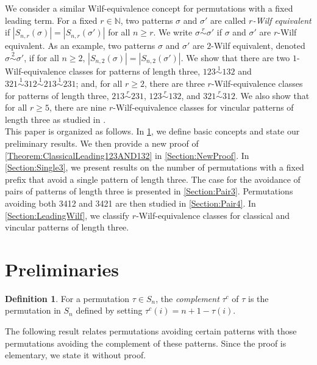 \documentclass[11pt]{article}
\theoremstyle{definition}
\newtheorem{definition}[theorem]{Definition}
\newcommand{\rsim}{\stackrel{r}{\sim}}
\numberwithin{equation}{section}
\begin{document}
We consider a similar Wilf-equivalence concept for permutations with a fixed leading term. 
For a 
fixed $r\in\mathbb{N}$, two patterns $\sigma$ and $\sigma'$ are 
called {\em $r$-Wilf equivalent} if $|S_{n,r}(\sigma)|=|S_{n,r}(\sigma')|$ for all 
$n\geq r$. We 
write $\sigma\rsim\sigma'$ if $\sigma$ and $\sigma'$ are $r$-Wilf equivalent. As an example, two patterns $\sigma$ and $\sigma'$ are $2$-Wilf 
equivalent, denoted $\sigma\stackrel{2}{\sim}\sigma'$, if for all $n\geq2$, $|S_{n,2}(\sigma)|=|S_{n,2}(\sigma')|$. We show that there are two $1$-Wilf-equivalence classes 
for patterns of length three, 
$123\stackrel{1}{\sim} 132$ and $321\stackrel{1}{\sim}312\stackrel{1}{\sim}213\stackrel{1}{\sim}231$; and, for all $r\geq2$, there are three $r$-Wilf-equivalence classes for patterns of length three, $213\rsim231$, $123\rsim132$, and $321\rsim312$. We also show that for all $r\geq5$, there are nine $r$-Wilf-equivalence classes for vincular patterns of length three as studied in \cite{BabsonSteingrimsson2000,Claesson2001}.
\\



This paper is organized as follows. In \cref{Section:Preliminaries}, we define basic 
concepts and state our preliminary results. We then provide a new proof of \cref{Theorem:ClassicalLeading123AND132} in \cref{Section:NewProof}. In \cref{Section:Single3}, we present results on the number of permutations 
with a fixed prefix that avoid a single pattern of length three. 
The case for the avoidance of pairs of patterns of length three 
is presented in \cref{Section:Pair3}. Permutations avoiding both 3412 and 3421 are then studied in \cref{Section:Pair4}. In \cref{Section:LeadingWilf}, we classify $r$-Wilf-equivalence classes for classical and vincular patterns of length three.



\section{Preliminaries}\label{Section:Preliminaries}
\begin{definition}\label{Definition:Complements}
    For a permutation $\tau\in S_n$, the {\em complement} $\tau^c$ of $\tau$ is the permutation in $S_n$ defined by setting 
$\tau^c(i)=n+1-\tau(i)$.
\end{definition}
The following result relates permutations avoiding 
certain patterns with those permutations avoiding the complement of 
these patterns. Since the proof is elementary, we state it without proof.
\end{document}

